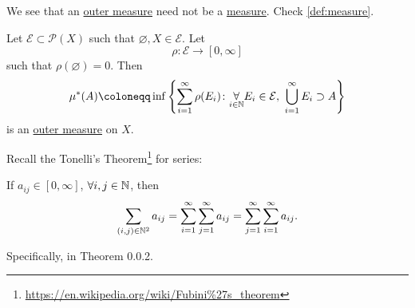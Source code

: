\begin{remark}
  We see that an \hyperref[def:outer-measure]{outer measure} need not be a \hyperref[def:measure]{measure}. Check \autoref{def:measure}.
\end{remark}

\begin{proposition}\label{prop:outer-measure}
  Let \(\mathcal{E} \subset \mathcal{P} (X)\) such that \(\varnothing, X \in  \mathcal{E} \). Let
  \[
    \rho\colon \mathcal{E} \to [0, \infty ]
  \]
  such that \(\rho(\varnothing ) = 0\). Then
  \[
    \mu^{*} (A) \coloneqq \inf\left\{\sum\limits_{i=1}^{\infty} \rho(E_{i})\colon \underset{i\in \mathbb{\MakeUppercase{N}} }{\forall}E_{i}\in \mathcal{E},\ \bigcup\limits_{i=1}^{\infty} E_{i}\supset A\right\}
  \]
  is an \hyperref[def:outer-measure]{outer measure} on \(X\).
\end{proposition}

\begin{note}\label{thm:Tonelli-theorem-for-series}
  Recall the Tonelli's Theorem\footnote{\url{https://en.wikipedia.org/wiki/Fubini\%27s_theorem}} for series:
  \par If \(a_{ij}\in [0, \infty ]\), \(\forall i, j\in \mathbb{\MakeUppercase{N}} \), then
  \[
    \sum\limits_{(i, j)\in\mathbb{\MakeUppercase{N}} ^2}a_{ij} = \sum\limits_{i=1}^{\infty} \sum\limits_{j=1}^{\infty} a_{ij} = \sum\limits_{j=1}^{\infty} \sum\limits_{i=1}^{\infty} a_{ij}.
  \]

  Specifically, in \cite{tao2013introduction} Theorem 0.0.2.
\end{note}